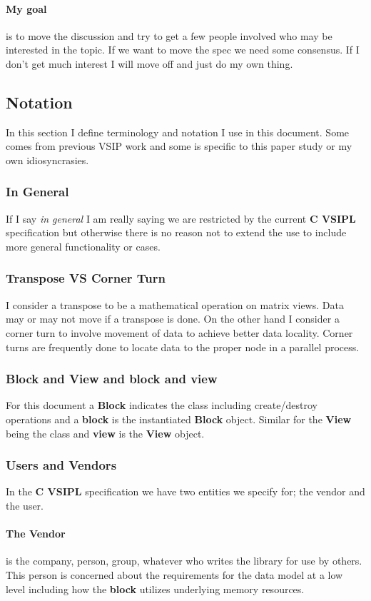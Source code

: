 \documentclass[11pt, oneside]{article}
\newcommand{\cvl}{\ttbf{C VSIPL}}
\newcommand{\ttbf}[1]{{\ttfamily \bfseries #1}}
\newcommand{\Blk}{\ttbf{Block}}
\newcommand{\blk}{\ttbf{block}}
\newcommand{\Vw}{\ttbf{View}}
\newcommand{\vw}{\ttbf{view}}
\begin{document}
\paragraph{My goal} is to move the discussion and try to get a few people involved who may be interested in the topic.  If we want to move the spec we need some consensus. If I don't get much interest I will move off and just do my own thing.
\subsection{Notation}
In this section I define terminology and notation I use in this document. Some comes from previous VSIP work and some is specific to this paper study or my own idiosyncrasies.
\subsubsection{In General}
If I say \emph{in general} I am really saying we are restricted by the current \cvl{} specification but otherwise there is no reason not to extend the use to include more general functionality or cases. 
\subsubsection{Transpose VS Corner Turn}
I consider a transpose to be a mathematical operation on matrix views. Data may or may not move if a transpose is done. On the other hand I consider a corner turn to involve movement of data to achieve better data locality. Corner turns are frequently done to locate data to the proper node in a parallel process.
\subsubsection{\Blk{} and \Vw{} and \blk{} and \vw}
For this document a \Blk{} indicates the class including create/destroy operations and a \blk{} is the instantiated \Blk{} object. Similar for the \Vw{} being the class and \vw{} is the \Vw{} object.
\subsubsection{Users and Vendors}
In the \cvl{} specification we have two entities we specify for; the vendor and the user. 
\paragraph{The \ttbf{Vendor}} is the company, person, group, whatever who writes the library for use by others. This person is concerned about the requirements for the data model at a low level including how the \blk{} utilizes underlying memory resources.
\end{document}
